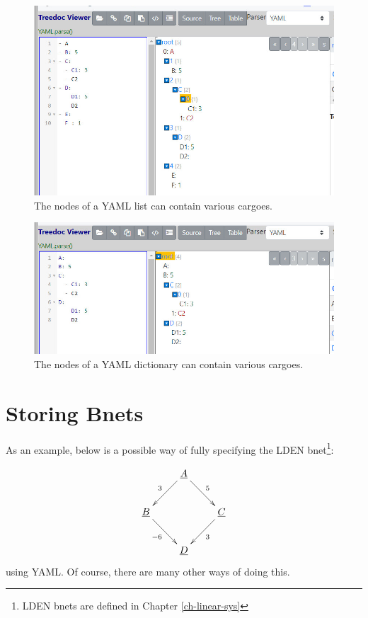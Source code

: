 \begin{figure}[h!]
\centering
\includegraphics[width=6in]
{yaml/yaml-list-nodes.jpg}
\caption{The  nodes of a YAML list can contain various cargoes.}
\label{fig-yaml-list-nodes}
\end{figure}

\begin{figure}[h!]
\centering
\includegraphics[width=6in]
{yaml/yaml-dict-nodes.jpg}
\caption{The nodes of a YAML dictionary can contain various cargoes. }
\label{fig-yaml-dict-nodes}
\end{figure}

\section{Storing Bnets}

As an example, below is a
possible way of
fully specifying the LDEN
 bnet\footnote{LDEN bnets are defined in Chapter \ref{ch-linear-sys}}:

$$
\xymatrix{
&\ul{A}\ar[dl]_3\ar[dr]^5
\\
\ul{B}\ar[dr]_{-6} & &\ul{C}\ar[dl]^{3} \\
&\ul{D}
}
$$
using YAML. Of course,
there are
many other ways of
doing this.

